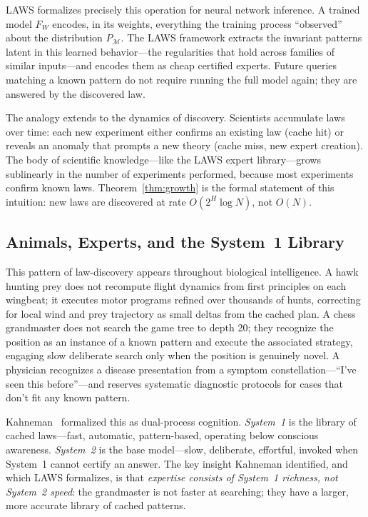 \documentclass[11pt]{article}
\begin{document}
LAWS formalizes precisely this operation for neural network inference.  A
trained model $F_W$ encodes, in its weights, everything the training process
``observed'' about the distribution $P_{\mathcal{M}}$.  The LAWS framework
extracts the invariant patterns latent in this learned behavior---the
regularities that hold across families of similar inputs---and encodes them
as cheap certified experts.  Future queries matching a known pattern do not
require running the full model again; they are answered by the discovered law.

The analogy extends to the dynamics of discovery.  Scientists accumulate laws
over time: each new experiment either confirms an existing law (cache hit) or
reveals an anomaly that prompts a new theory (cache miss, new expert creation).
The body of scientific knowledge---like the LAWS expert library---grows
sublinearly in the number of experiments performed, because most experiments
confirm known laws.  Theorem~\ref{thm:growth} is the formal statement of this
intuition: new laws are discovered at rate $O(2^H \log N)$, not $O(N)$.

\subsection{Animals, Experts, and the System~1 Library}

This pattern of law-discovery appears throughout biological intelligence.
A hawk hunting prey does not recompute flight dynamics from first principles
on each wingbeat; it executes motor programs refined over thousands of hunts,
correcting for local wind and prey trajectory as small deltas from the cached
plan.  A chess grandmaster does not search the game tree to depth 20; they
recognize the position as an instance of a known pattern and execute the
associated strategy, engaging slow deliberate search only when the position
is genuinely novel.  A physician recognizes a disease presentation from a
symptom constellation---``I've seen this before''---and reserves systematic
diagnostic protocols for cases that don't fit any known pattern.

Kahneman~\cite{kahneman2011} formalized this as dual-process cognition.
\emph{System~1} is the library of cached laws---fast, automatic, pattern-based,
operating below conscious awareness.  \emph{System~2} is the base model---slow,
deliberate, effortful, invoked when System~1 cannot certify an answer.
The key insight Kahneman identified, and which LAWS formalizes, is that
\emph{expertise consists of System~1 richness, not System~2 speed}: the
grandmaster is not faster at searching; they have a larger, more accurate
library of cached patterns.
\end{document}
